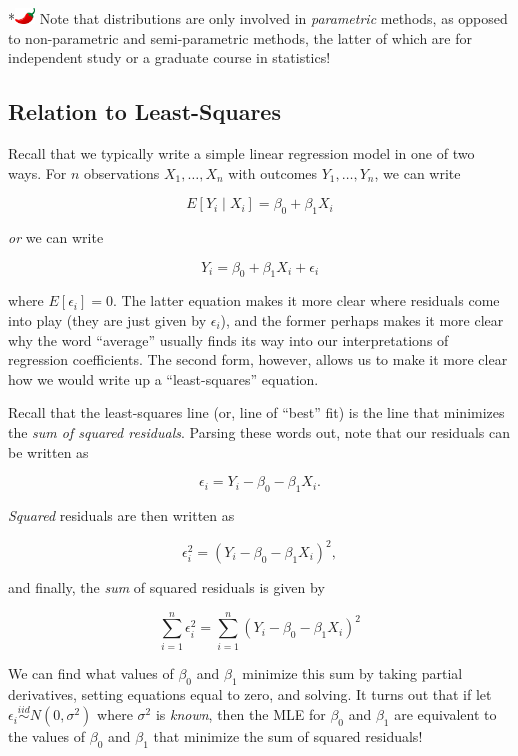 \documentclass[
  letterpaper,
  DIV=11,
  numbers=noendperiod]{scrreprt}
\begin{document}
*\includegraphics[width=0.20833in,height=0.16667in]{images/chilipepper.png}
Note that distributions are only involved in \emph{parametric} methods,
as opposed to non-parametric and semi-parametric methods, the latter of
which are for independent study or a graduate course in statistics!

\subsection*{Relation to Least-Squares}\label{relation-to-least-squares}

Recall that we typically write a simple linear regression model in one
of two ways. For \(n\) observations \(X_1, \dots, X_n\) with outcomes
\(Y_1, \dots, Y_n\), we can write

\[
E[Y_i \mid X_i] = \beta_0 + \beta_1 X_i
\]

\emph{or} we can write

\[
Y_i = \beta_0 + \beta_1 X_i + \epsilon_i
\]

where \(E[\epsilon_i] = 0\). The latter equation makes it more clear
where residuals come into play (they are just given by \(\epsilon_i\)),
and the former perhaps makes it more clear why the word ``average''
usually finds its way into our interpretations of regression
coefficients. The second form, however, allows us to make it more clear
how we would write up a ``least-squares'' equation.

Recall that the least-squares line (or, line of ``best'' fit) is the
line that minimizes the \emph{sum of squared residuals}. Parsing these
words out, note that our residuals can be written as

\[
\epsilon_i = Y_i - \beta_0 - \beta_1 X_i.
\]

\emph{Squared} residuals are then written as

\[
\epsilon_i^2 = (Y_i - \beta_0 - \beta_1 X_i)^2,
\]

and finally, the \emph{sum} of squared residuals is given by

\[
\sum_{i = 1}^n \epsilon_i^2 = \sum_{i = 1}^n (Y_i - \beta_0 - \beta_1 X_i)^2
\]

We can find what values of \(\beta_0\) and \(\beta_1\) minimize this sum
by taking partial derivatives, setting equations equal to zero, and
solving. It turns out that if let
\(\epsilon_i \overset{iid}{\sim} N(0, \sigma^2)\) where \(\sigma^2\) is
\emph{known}, then the MLE for \(\beta_0\) and \(\beta_1\) are
equivalent to the values of \(\beta_0\) and \(\beta_1\) that minimize
the sum of squared residuals!
\end{document}
